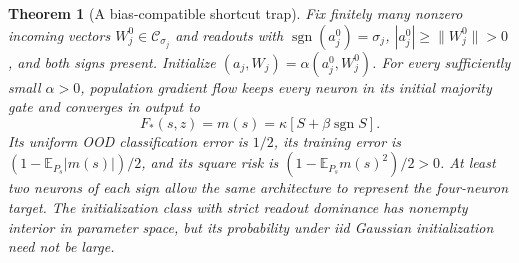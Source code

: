 \documentclass[11pt]{article}
\newtheorem{theorem}{Theorem}\newtheorem{lemma}[theorem]{Lemma}
\newcommand{\E}{\mathbb E}\newcommand{\R}{\mathbb R}
\begin{document}
\begin{theorem}[A bias-compatible shortcut trap]
Fix finitely many nonzero incoming vectors $W_j^0\in\mathcal C_{\sigma_j}$
and readouts with $\operatorname{sgn}(a_j^0)=\sigma_j$,
$|a_j^0|\ge\|W_j^0\|>0$, and both signs present.
Initialize $(a_j,W_j)=\alpha(a_j^0,W_j^0)$.
For every sufficiently small $\alpha>0$, population gradient flow
keeps every neuron in its initial majority gate and converges in output
to
\[
 F_*(s,z)=m(s)=\kappa[S+\beta\operatorname{sgn}S].
\]
Its uniform OOD classification error is $1/2$, its training error is
$(1-\E_{P_s}|m(s)|)/2$, and its square risk is
$(1-\E_{P_s}m(s)^2)/2>0$.
At least two neurons of each sign allow the same architecture to
represent the four-neuron target. The initialization class with strict
readout dominance has nonempty interior in parameter space, but its
probability under iid Gaussian initialization need not be large.
\end{theorem}
\end{document}
